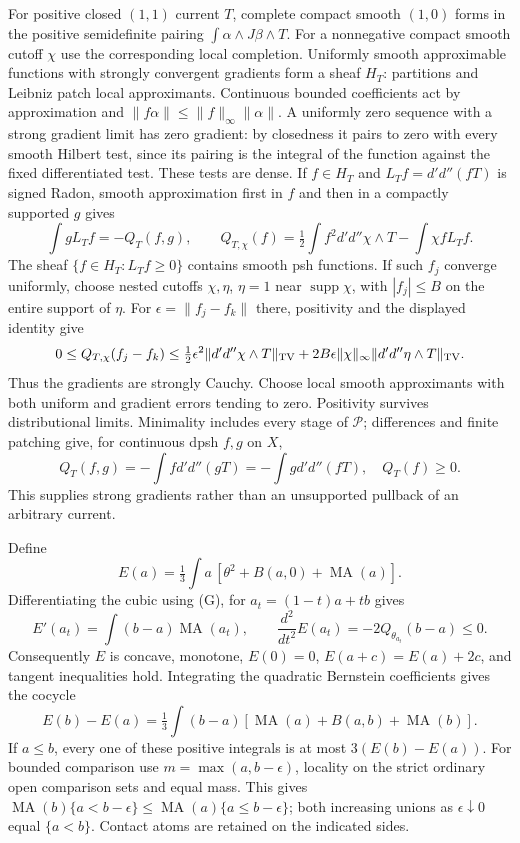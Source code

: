 \documentclass[11pt]{article}
\newcommand{\DD}{d'd''}
\newcommand{\MA}{\operatorname{MA}}
\theoremstyle{remark}\newtheorem{remark}[theorem]{Remark}
\begin{document}
For positive closed $(1,1)$ current $T$, complete compact smooth
$(1,0)$ forms in the positive semidefinite pairing
$\int \alpha\wedge J\beta\wedge T$. For a nonnegative compact smooth
cutoff $\chi$ use the corresponding local completion. Uniformly smooth
approximable functions with strongly convergent gradients form a sheaf
$H_T$: partitions and Leibniz patch local approximants. Continuous
bounded coefficients act by approximation and
$\|f\alpha\|\le\|f\|_\infty\|\alpha\|$.
A uniformly zero sequence with a strong gradient limit has zero
gradient: by closedness it pairs to zero with every smooth Hilbert test,
since its pairing is the integral of the function against the fixed
differentiated test. These tests are dense.
If $f\in H_T$ and $L_Tf=\DD(fT)$ is signed Radon, smooth
approximation first in $f$ and then in a compactly supported $g$ gives
\[
\int g L_Tf=-Q_T(f,g),\qquad
Q_{T,\chi}(f)=\tfrac12\int f^2\DD\chi\wedge T-
\int\chi fL_Tf.
\]
The sheaf $\{f\in H_T:L_Tf\ge0\}$ contains smooth psh functions.
If such $f_j$ converge uniformly, choose nested cutoffs $\chi,\eta$,
$\eta=1$ near $\operatorname{supp}\chi$, with $|f_j|\le B$ on
the entire support of $\eta$. For $\epsilon=\|f_j-f_k\|$ there,
positivity and the displayed identity give
\[
0\le Q_{T,\chi}(f_j-f_k)\le
\tfrac12\epsilon^2\|\DD\chi\wedge T\|_{\rm TV}
+2B\epsilon\|\chi\|_\infty\|\DD\eta\wedge T\|_{\rm TV}.
\]
Thus the gradients are strongly Cauchy. Choose local smooth approximants
with both uniform and gradient errors tending to zero. Positivity
survives distributional limits. Minimality includes every stage of
$\mathscr P$; differences and finite patching give, for continuous dpsh
$f,g$ on $X$,
\[
Q_T(f,g)=-\int f\DD(gT)=-\int g\DD(fT),\quad Q_T(f)\ge0.
\tag{G}
\]
This supplies strong gradients rather than an unsupported pullback of
an arbitrary current.

Define
\[
E(a)=\tfrac13\int a\,[\theta^2+B(a,0)+\MA(a)].
\]
Differentiating the cubic using (G), for $a_t=(1-t)a+tb$ gives
\[
E'(a_t)=\int(b-a)\MA(a_t),\qquad
\frac{d^2}{dt^2}E(a_t)=-2Q_{\theta_{a_t}}(b-a)\le0.
\]
Consequently $E$ is concave, monotone, $E(0)=0$,
$E(a+c)=E(a)+2c$, and tangent inequalities hold. Integrating the
quadratic Bernstein coefficients gives the cocycle
\[
E(b)-E(a)=\tfrac13\int(b-a)[\MA(a)+B(a,b)+\MA(b)].
\tag{C}
\]
If $a\le b$, every one of these positive integrals is at most
$3(E(b)-E(a))$.
For bounded comparison use $m=\max(a,b-\epsilon)$, locality on the
strict ordinary open comparison sets and equal mass. This gives
$\MA(b)\{a<b-\epsilon\}\le\MA(a)\{a\le b-\epsilon\}$;
both increasing unions as $\epsilon\downarrow0$ equal $\{a<b\}$.
Contact atoms are retained on the indicated sides.
\end{document}
